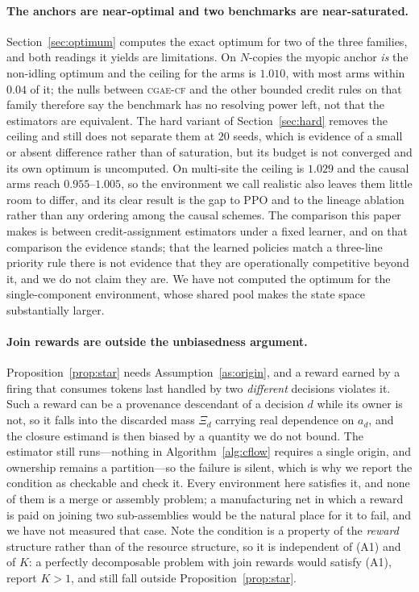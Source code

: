 \documentclass[review,authoryear,3p,times]{elsarticle}
\newcommand{\cflow}{\textsc{cgae-cf}}          %
\begin{document}
\paragraph{The anchors are near-optimal and two benchmarks are near-saturated.}
Section~\ref{sec:optimum} computes the exact
optimum for two of the three families, and both readings it yields
are limitations. On $N$-copies the myopic anchor \emph{is} the non-idling
optimum and the ceiling for the arms is $1.010$, with most arms within $0.04$
of it; the nulls between
\cflow{} and the other bounded credit rules on that family therefore say the
benchmark has no resolving power left, not that the estimators are equivalent.
The hard variant of Section~\ref{sec:hard} removes the ceiling and still does
not separate them at $20$ seeds, which is evidence of a small or absent
difference rather than of saturation, but its budget is not converged and its
own optimum is uncomputed. On multi-site the ceiling is $1.029$ and the causal
arms reach $0.955$--$1.005$, so the environment we call realistic also leaves
them little room to differ, and its clear result is the gap to PPO and to the
lineage ablation rather than any ordering among the causal schemes. The
comparison this paper makes is between credit-assignment estimators under a
fixed learner, and on that comparison the evidence stands; that the learned
policies match a three-line priority rule there is not evidence that they are
operationally competitive beyond it, and we do not claim they are. We have not
computed the optimum for
the single-component environment, whose shared pool makes the state space
substantially larger.

\paragraph{Join rewards are outside the unbiasedness argument.}
Proposition~\ref{prop:star} needs Assumption~\ref{as:origin}, and a reward
earned by a firing that consumes tokens last handled by two \emph{different}
decisions violates it. Such a reward can be a provenance descendant of a
decision $d$ while its owner is not, so it falls into the discarded mass
$\Xi_d$ carrying real dependence on $a_d$, and the closure estimand is then
biased by a quantity we do not bound. The estimator still runs---nothing in
Algorithm~\ref{alg:cflow} requires a single origin, and ownership remains a
partition---so the failure is silent, which is why we report the condition as
checkable and check it. Every environment here satisfies it, and none of them
is a merge or assembly problem; a manufacturing net in which a reward is paid
on joining two sub-assemblies would be the natural place for it to fail, and we
have not measured that case. Note the condition is a property of the
\emph{reward} structure rather than of the resource structure, so it is
independent of (A1) and of $K$: a perfectly decomposable problem with join
rewards would satisfy (A1), report $K>1$, and still fall outside
Proposition~\ref{prop:star}.
\end{document}
